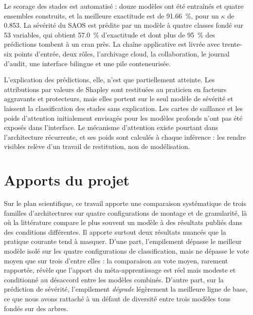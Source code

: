 Le scorage des stades est automatisé : douze modèles ont été entraînés et quatre
ensembles construits, et la meilleure exactitude est de \SI{91,66}{\percent}, pour un
$\kappa$ de \num{0,853}. La sévérité du SAOS est prédite par un modèle à quatre classes
fondé sur 53 variables, qui obtient \SI{57,0}{\percent} d'exactitude et dont plus de
\SI{95}{\percent} des prédictions tombent à un cran près. La chaîne applicative est
livrée avec trente-six points d'entrée, deux rôles, l'archivage cloud, la collaboration,
le journal d'audit, une interface bilingue et une pile conteneurisée.

L'explication des prédictions, elle, n'est que partiellement atteinte. Les attributions
par valeurs de Shapley sont restituées au praticien en facteurs aggravants et
protecteurs, mais elles portent sur le seul modèle de sévérité et laissent la
classification des stades sans explication. Les cartes de saillance et les poids
d'attention initialement envisagés pour les modèles profonds n'ont pas été exposés dans
l'interface. Le mécanisme d'attention existe pourtant dans l'architecture récurrente,
et ses poids sont calculés à chaque inférence : les rendre visibles relève d'un travail
de restitution, non de modélisation.

\section*{Apports du projet}

Sur le plan scientifique, ce travail apporte une comparaison systématique de
trois familles d'architectures sur quatre configurations de montage et de granularité,
là où la littérature compare le plus souvent un modèle à des résultats publiés dans des
conditions différentes. Il apporte surtout deux résultats nuancés que la pratique
courante tend à masquer. D'une part, l'empilement dépasse le meilleur modèle isolé sur
les quatre configurations de classification, mais ne dépasse le vote moyen que sur trois
d'entre elles : la comparaison au vote moyen, rarement rapportée, révèle que l'apport
du méta-apprentissage est réel mais modeste et conditionné au désaccord entre les
modèles combinés. D'autre part, sur la prédiction de sévérité, l'empilement
\emph{dégrade} légèrement la meilleure ligne de base, ce que nous avons rattaché à un
défaut de diversité entre trois modèles tous fondés sur des arbres.

